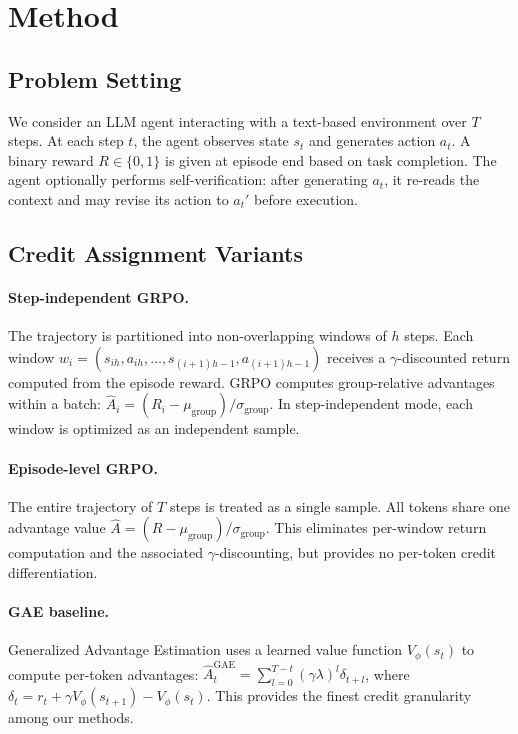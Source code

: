 \documentclass[11pt]{article}
\begin{document}
\section{Method}

\subsection{Problem Setting}

We consider an LLM agent interacting with a text-based environment over $T$ steps.
At each step $t$, the agent observes state $s_t$ and generates action $a_t$.
A binary reward $R \in \{0, 1\}$ is given at episode end based on task completion.
The agent optionally performs self-verification: after generating $a_t$, it re-reads the context and may revise its action to $a_t'$ before execution.

\subsection{Credit Assignment Variants}

\paragraph{Step-independent GRPO.}
The trajectory is partitioned into non-overlapping windows of $h$ steps.
Each window $w_i = (s_{ih}, a_{ih}, \ldots, s_{(i+1)h-1}, a_{(i+1)h-1})$ receives a $\gamma$-discounted return computed from the episode reward.
GRPO computes group-relative advantages within a batch: $\hat{A}_i = (R_i - \mu_{\text{group}}) / \sigma_{\text{group}}$.
In step-independent mode, each window is optimized as an independent sample.

\paragraph{Episode-level GRPO.}
The entire trajectory of $T$ steps is treated as a single sample.
All tokens share one advantage value $\hat{A} = (R - \mu_{\text{group}}) / \sigma_{\text{group}}$.
This eliminates per-window return computation and the associated $\gamma$-discounting, but provides no per-token credit differentiation.

\paragraph{GAE baseline.}
Generalized Advantage Estimation uses a learned value function $V_\phi(s_t)$ to compute per-token advantages:
$\hat{A}_t^{\text{GAE}} = \sum_{l=0}^{T-t} (\gamma \lambda)^l \delta_{t+l}$,
where $\delta_t = r_t + \gamma V_\phi(s_{t+1}) - V_\phi(s_t)$.
This provides the finest credit granularity among our methods.
\end{document}
